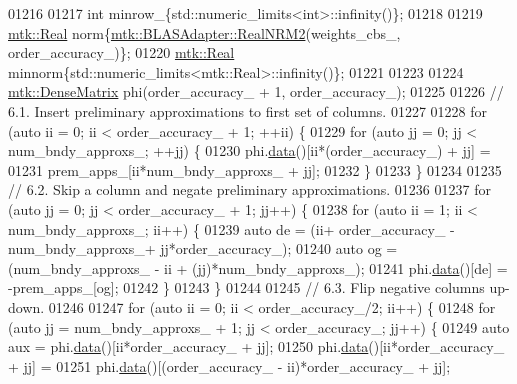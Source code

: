 \begin{DoxyCode}
{{01216 
01217     \textcolor{keywordtype}{int} minrow\_\{std::numeric\_limits<int>::infinity()\};
01218 
01219     \hyperlink{group__c01-roots_gac080bbbf5cbb5502c9f00405f894857d}{mtk::Real} norm\{\hyperlink{classmtk_1_1BLASAdapter_ab92440888b730863244c5d9479c11aca}{mtk::BLASAdapter::RealNRM2}(weights\_cbs\_,
      order\_accuracy\_)\};
01220     \hyperlink{group__c01-roots_gac080bbbf5cbb5502c9f00405f894857d}{mtk::Real} minnorm\{std::numeric\_limits<mtk::Real>::infinity()\};
01221 
01223 
01224     \hyperlink{classmtk_1_1DenseMatrix}{mtk::DenseMatrix} phi(order\_accuracy\_ + 1, order\_accuracy\_);
01225 
01226     \textcolor{comment}{// 6.1. Insert preliminary approximations to first set of columns.}
01227 
01228     \textcolor{keywordflow}{for} (\textcolor{keyword}{auto} ii = 0; ii < order\_accuracy\_ + 1; ++ii) \{
01229       \textcolor{keywordflow}{for} (\textcolor{keyword}{auto} jj = 0; jj < num\_bndy\_approxs\_; ++jj) \{
01230         phi.\hyperlink{classmtk_1_1DenseMatrix_a16b3ff56feb2658b9fc7147d1de4d8e7}{data}()[ii*(order\_accuracy\_) + jj] =
01231           prem\_apps\_[ii*num\_bndy\_approxs\_ + jj];
01232       \}
01233     \}
01234 
01235     \textcolor{comment}{// 6.2. Skip a column and negate preliminary approximations.}
01236 
01237     \textcolor{keywordflow}{for} (\textcolor{keyword}{auto} jj = 0; jj < order\_accuracy\_ + 1; jj++) \{
01238       \textcolor{keywordflow}{for} (\textcolor{keyword}{auto} ii = 1; ii < num\_bndy\_approxs\_; ii++) \{
01239         \textcolor{keyword}{auto} de = (ii+ order\_accuracy\_ - num\_bndy\_approxs\_+ jj*order\_accuracy\_);
01240         \textcolor{keyword}{auto} og = (num\_bndy\_approxs\_ - ii + (jj)*num\_bndy\_approxs\_);
01241         phi.\hyperlink{classmtk_1_1DenseMatrix_a16b3ff56feb2658b9fc7147d1de4d8e7}{data}()[de] = -prem\_apps\_[og];
01242       \}
01243     \}
01244 
01245     \textcolor{comment}{// 6.3. Flip negative columns up-down.}
01246 
01247     \textcolor{keywordflow}{for} (\textcolor{keyword}{auto} ii = 0; ii < order\_accuracy\_/2; ii++) \{
01248       \textcolor{keywordflow}{for} (\textcolor{keyword}{auto} jj = num\_bndy\_approxs\_ + 1; jj < order\_accuracy\_; jj++) \{
01249         \textcolor{keyword}{auto} aux = phi.\hyperlink{classmtk_1_1DenseMatrix_a16b3ff56feb2658b9fc7147d1de4d8e7}{data}()[ii*order\_accuracy\_ + jj];
01250         phi.\hyperlink{classmtk_1_1DenseMatrix_a16b3ff56feb2658b9fc7147d1de4d8e7}{data}()[ii*order\_accuracy\_ + jj] =
01251           phi.\hyperlink{classmtk_1_1DenseMatrix_a16b3ff56feb2658b9fc7147d1de4d8e7}{data}()[(order\_accuracy\_ - ii)*order\_accuracy\_ + jj];
}}
\end{DoxyCode}
